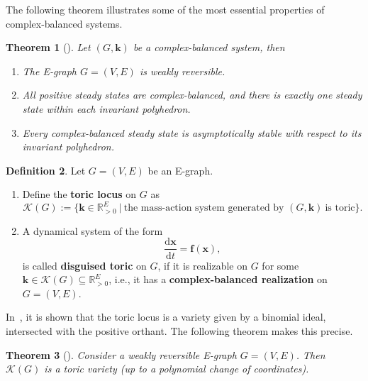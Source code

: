 \documentclass[11pt]{article}
\theoremstyle{plain}
\newtheorem{theorem}{Theorem}[section]
\theoremstyle{definition}
\newtheorem{definition}[theorem]{Definition}
\theoremstyle{remark}
\renewcommand\bf{\boldsymbol{f}}
\newcommand\bk{\boldsymbol{k}}
\newcommand\bx{\boldsymbol{x}}
\newcommand{\mK}{\mathcal{K}}
\newcommand{\defi}{\textbf}
\begin{document}
The following theorem illustrates some of the most essential properties of complex-balanced systems.   

\begin{theorem}[\cite{horn1972general}]
\label{thm:cb}
Let $(G, \bk)$ be a complex-balanced system, then 
\begin{enumerate}
\item[(a)] The E-graph $G=(V,E)$ is weakly reversible.

\item[(b)] All positive steady states are complex-balanced, and there is exactly one steady state within each invariant polyhedron. 

\item[(c)] Every complex-balanced steady state is asymptotically stable with respect to its invariant polyhedron. 
\end{enumerate}
\end{theorem}

\begin{definition} 
Let $G=(V, E)$ be an E-graph.
\begin{enumerate}

\item[(a)] Define the \defi{toric locus} on $G$ as
\begin{equation}
\mK (G) := \{ \bk \in \mathbb{R}_{>0}^{E} \ \big| \ \text{the mass-action system generated by } (G, \bk) \ \text{is toric} \}.
\end{equation}

\item[(b)] A dynamical system of the form 
\begin{equation} 
 \frac{\mathrm{d} \bx}{\mathrm{d} t} 
= \bf (\bx),
\end{equation}
is called \defi{disguised toric} on $G$, if it is realizable on $G$
for some $\bk \in \mK (G) \subseteq \mathbb{R}_{>0}^{E}$, i.e., it has a \defi{complex-balanced realization} on $G=(V, E)$.
\end{enumerate}
\end{definition}


In~\cite{CraciunDickensteinShiuSturmfels2009}, it is shown that the toric locus is a variety given by a binomial ideal, intersected with the positive orthant. The following theorem makes this precise.

\begin{theorem}[\cite{CraciunDickensteinShiuSturmfels2009}]
\label{thm:homeo}
Consider a weakly reversible E-graph $G = (V, E)$. Then $\mK(G)$ is a toric variety (up to a polynomial change of coordinates).
\end{theorem}
\end{document}
